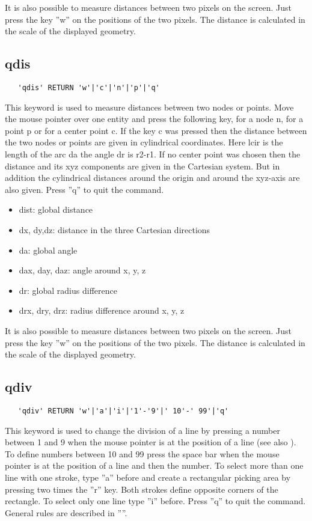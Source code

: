 \documentclass{article}
\begin{document}
It is also possible to measure distances between two pixels on the screen. Just press the key ''w'' on the positions of the two pixels. The distance is calculated in the scale of the displayed geometry.

\subsection{\label{qdis}qdis}
\begin{verbatim}
   'qdis' RETURN 'w'|'c'|'n'|'p'|'q' 
\end{verbatim}
This keyword is used to measure distances between two nodes or points. Move the mouse pointer over one entity and press the following key, for a node n, for a point p or for a center point c. If the key c was pressed then the distance between the two nodes or points are given in cylindrical coordinates. Here lcir is the length of the arc da the angle dr is r2-r1. If no center point was chosen then the distance and its xyz components are given in the Cartesian system. But in addition the cylindrical distances around the origin and around the xyz-axis are also given. Press ''q'' to quit the command.

\begin{itemize}
\item dist: global distance
\item dx, dy,dz: distance in the three Cartesian directions
\item da: global angle
\item dax, day, daz: angle around x, y, z
\item dr: global radius difference
\item drx, dry, drz: radius difference around x, y, z
\end{itemize}

It is also possible to measure distances between two pixels on the screen. Just press the key ''w'' on the positions of the two pixels. The distance is calculated in the scale of the displayed geometry.

\subsection{\label{qdiv}qdiv}
\begin{verbatim}
   'qdiv' RETURN 'w'|'a'|'i'|'1'-'9'|' 10'-' 99'|'q' 
\end{verbatim}
This keyword is used to change the division of a line by pressing a number between 1 and 9 when the mouse pointer is at the position of a line (see also ). To define numbers between 10 and 99 press the space bar when the mouse pointer is at the position of a line and then the number. To select more than one line with one stroke, type ''a'' before and create a rectangular picking area by pressing two times the ''r'' key. Both strokes define opposite corners of the rectangle. To select only one line type ''i'' before. Press ''q'' to quit the command. General rules are described in ''''. 
\end{document}
